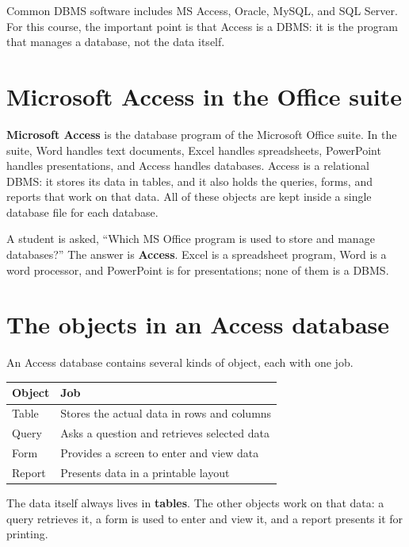 Common DBMS software includes MS Access, Oracle, MySQL, and SQL Server. For
this course, the important point is that Access is a DBMS: it is the program
that manages a database, not the data itself.

\section{Microsoft Access in the Office suite}
\textbf{Microsoft Access} is the database program of the Microsoft Office
suite. In the suite, Word handles text documents, Excel handles spreadsheets,
PowerPoint handles presentations, and Access handles databases. Access is a
relational DBMS: it stores its data in tables, and it also holds the queries,
forms, and reports that work on that data. All of these objects are kept
inside a single database file for each database.

\begin{example}
A student is asked, ``Which MS Office program is used to store and manage
databases?'' The answer is \textbf{Access}. Excel is a spreadsheet program,
Word is a word processor, and PowerPoint is for presentations; none of them
is a DBMS.
\end{example}

\section{The objects in an Access database}
An Access database contains several kinds of object, each with one job.

\begin{center}
\begin{tabular}{p{}p{}}
\toprule
\textbf{Object} & \textbf{Job} \\
\midrule
Table & Stores the actual data in rows and columns \\
Query & Asks a question and retrieves selected data \\
Form & Provides a screen to enter and view data \\
Report & Presents data in a printable layout \\
\bottomrule
\end{tabular}
\end{center}

The data itself always lives in \textbf{tables}. The other objects work on
that data: a query retrieves it, a form is used to enter and view it, and a
report presents it for printing.

